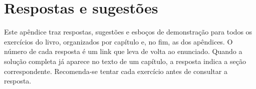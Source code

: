 \chapter{Respostas e sugestões}\label{ap:respostas}
Este apêndice traz respostas, sugestões e esboços de demonstração para todos os exercícios do livro, organizados por capítulo e, no fim, as dos apêndices. O número de cada resposta é um link que leva de volta ao enunciado. Quando a solução completa já aparece no texto de um capítulo, a resposta indica a seção correspondente. Recomenda-se tentar cada exercício antes de consultar a resposta.

\small



















\renewcommand{\respcapnome}{Apêndice}


\normalsize
